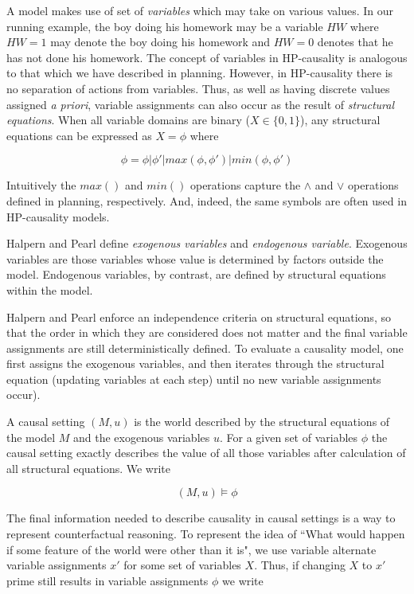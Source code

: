 \documentclass{article}
\theoremstyle{plain}
\theoremstyle{definition}
\begin{document}
A model makes use of set of \textit{variables} which may take on various values. In our running example, the boy doing his homework may be a variable $HW$ where $HW=1$ may denote the boy doing his homework and $HW=0$ denotes that he has not done his homework. The concept of variables in HP-causality is analogous to that which we have described in planning. However, in HP-causality there is no separation of actions from variables. Thus, as well as having discrete values assigned \textit{a priori}, variable assignments can also occur as the result of \textit{structural equations}. When all variable domains are binary ($X \in \{0,1\}$), any structural equations can be expressed as $X=\phi$ where

\[
\phi= \phi | \phi' | max(\phi, \phi') | min(\phi, \phi') 
\]

Intuitively the $max()$ and $min()$ operations capture the $\land$ and $\lor$ operations defined in planning, respectively. And, indeed, the same symbols are often used in HP-causality models.

Halpern and Pearl define \textit{exogenous variables} and \textit{endogenous variable}. Exogenous variables are those variables whose value is determined by factors outside the model. Endogenous variables, by contrast, are defined by structural equations within the model.

Halpern and Pearl enforce an independence criteria on structural equations, so that the order in which they are considered does not matter and the final variable assignments are still deterministically defined. To evaluate a causality model, one first assigns the exogenous variables, and then iterates through the structural equation (updating variables at each step) until no new variable assignments occur).

A causal setting $(M,u)$ is the world described by the structural equations of the model $M$ and the exogenous variables $u$. For a given set of variables $\phi$ the causal setting exactly describes the value of all those variables after calculation of all structural equations. We write

\[
(M,u) \models \phi
\]

The final information needed to describe causality in causal settings is a way to represent counterfactual reasoning. To represent the idea of ``What would happen if some feature of the world were other than it is", we use variable alternate variable assignments $x'$ for some set of variables $X$. Thus, if changing $X$ to $x'$ prime still results in variable assignments $\phi$ we write
\end{document}
